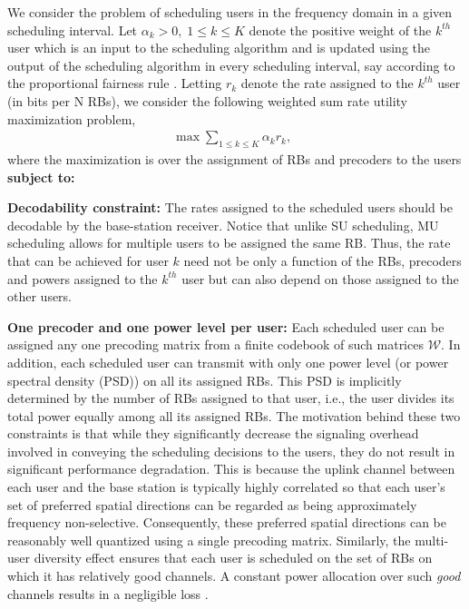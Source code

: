 \documentclass[11pt] {article}
\newcommand{\Wc} {{\mathcal W}}         \newcommand{\Wk} {{\bm {\mathcal W}}}
\begin{document}
We consider the problem of scheduling users in the frequency domain in a given scheduling interval. Let $\alpha_k>0,  \;1\leq k\leq K$ denote the positive weight of the $k^{th}$ user which is an input to the scheduling algorithm and is updated using the output of the scheduling algorithm in every scheduling interval, say according to the proportional fairness rule \cite{Liu-Knightly-2003}. Letting $r_k$ denote the rate assigned to the $k^{th}$ user (in bits per N RBs), we consider the following weighted sum rate utility maximization problem,
\begin{eqnarray}\label{eq:original}
 \max\sum_{1\leq k\leq K}\alpha_{k}r_k,\;\;
\end{eqnarray}
where the maximization is over the assignment of RBs and  precoders to the users
\textbf{subject to:}





  \textbf{Decodability constraint:} The rates assigned to the scheduled users should be decodable by the base-station receiver. Notice that unlike SU scheduling, MU scheduling allows for multiple users to be assigned the same RB. Thus, the rate that can be achieved for user $k$ need not be only a function of the RBs, precoders and powers assigned to the $k^{th}$ user but can also depend on  those assigned to the other users. 

 \textbf{One precoder and one power level per user:} Each scheduled user can be assigned any one precoding matrix from a finite codebook of such matrices  $\Wc$. In addition, each scheduled user can transmit with only one power level (or power spectral density (PSD))  on all its assigned RBs. This PSD is implicitly determined by the number of RBs assigned to that user, i.e., the user divides its total power equally among all its assigned RBs. The motivation behind these two constraints is that while they significantly decrease the signaling overhead involved in conveying the scheduling decisions to the users, they do not result in significant performance degradation. This is because the uplink channel between each user and the base station is typically highly correlated so that each user's set of preferred spatial directions can be regarded as being approximately frequency non-selective. Consequently, these preferred spatial directions can be reasonably well quantized using a single precoding matrix. Similarly,
    the multi-user diversity effect ensures that each user is scheduled on the set of RBs on which it has relatively good channels. A constant power allocation over such {\em good} channels results in a negligible loss \cite{YuW:Constant}.
\end{document}
